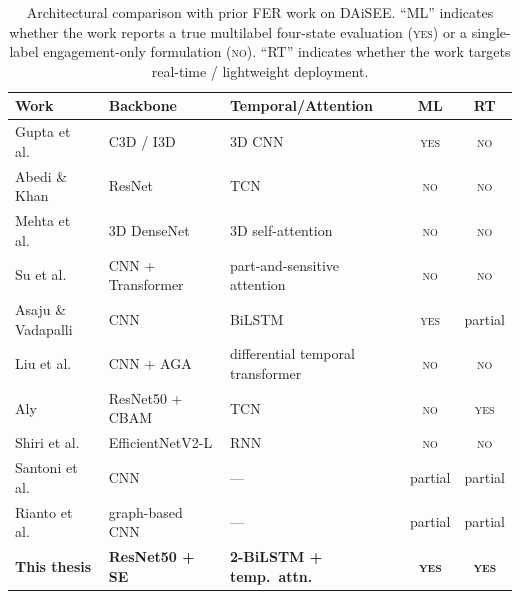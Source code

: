 \begin{table}[H]
\centering
\small
\caption{Architectural comparison with prior FER work on DAiSEE. ``ML'' indicates whether the work reports a true multilabel four-state evaluation (\textsc{yes}) or a single-label engagement-only formulation (\textsc{no}). ``RT'' indicates whether the work targets real-time / lightweight deployment.}
\label{tab:fer_lit_compare}
\begin{tabular}{p{3.4cm}p{3.5cm}p{3.6cm}cc}
\toprule
\textbf{Work} & \textbf{Backbone} & \textbf{Temporal/Attention} & \textbf{ML} & \textbf{RT} \\
\midrule
Gupta et al.\ \cite{gupta_daisee_2016}                & C3D / I3D            & 3D CNN                          & \textsc{yes} & \textsc{no}  \\
Abedi \& Khan \cite{abedi_improving_2021}             & ResNet               & TCN                             & \textsc{no}  & \textsc{no}  \\
Mehta et al.\ \cite{mehta_three-dimensional_2022}     & 3D DenseNet          & 3D self-attention               & \textsc{no}  & \textsc{no}  \\
Su et al.\ \cite{su_leveraging_2024}                  & CNN + Transformer    & part-and-sensitive attention    & \textsc{no}  & \textsc{no}  \\
Asaju \& Vadapalli \cite{asaju_adaptive_2022}         & CNN                  & BiLSTM                          & \textsc{yes} & partial      \\
Liu et al.\ \cite{liu_dynamic_nodate}                 & CNN + AGA            & differential temporal transformer & \textsc{no} & \textsc{no}  \\
Aly \cite{aly_revolutionizing_2025}                   & ResNet50 + CBAM      & TCN                             & \textsc{no}  & \textsc{yes} \\
Shiri et al.\ \cite{shiri_detection_2024}             & EfficientNetV2-L     & RNN                             & \textsc{no}  & \textsc{no}  \\
Santoni et al.\ \cite{santoni_convolutional_2023}     & CNN                  & ---                             & partial      & partial      \\
Rianto et al.\ \cite{rianto_engagement_2025}          & graph-based CNN      & ---                             & partial      & partial      \\
\midrule
\textbf{This thesis} & \textbf{ResNet50 + SE} & \textbf{2-BiLSTM + temp.\ attn.} & \textbf{\textsc{yes}} & \textbf{\textsc{yes}} \\
\bottomrule
\end{tabular}
\end{table}

